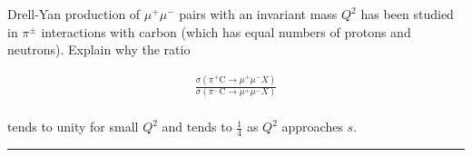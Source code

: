 
\begin{problem}{10.9}
Drell-Yan production of $\mu^+\mu^-$ pairs with an invariant mass $Q^2$ has been studied in $\pi^\pm$ interactions with carbon (which has equal numbers of protons and neutrons). Explain why the ratio

\begin{align*}
    \frac{\sigma\left( \pi^+ \text{C} \to \mu^+\mu^-X \right)}{\sigma\left( \pi^- \text{C} \to \mu^+\mu^-X \right)}
\end{align*}\\
tends to unity for small $Q^2$ and tends to $\frac{1}{4}$ as $Q^2$ approaches $s$.
\end{problem}
\begin{solution}

\end{solution}

\noindent\rule{7in}{1.5pt}

